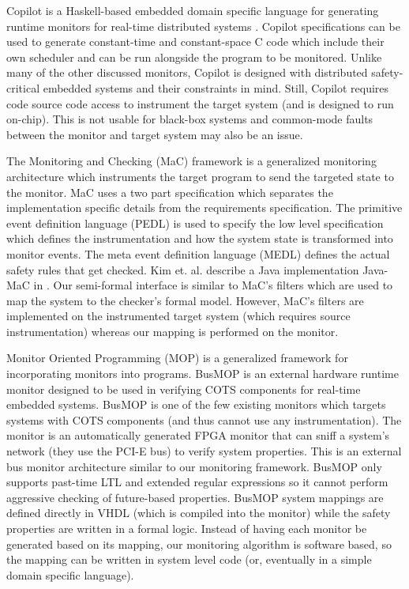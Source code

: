 \documentclass[]{llncs}
\begin{document}


Copilot is a Haskell-based embedded domain specific language for generating runtime monitors for real-time distributed systems \cite{Pike2010}. 
Copilot specifications can be used to generate constant-time and constant-space C code which include their own scheduler and can be run alongside the program to be monitored.
Unlike many of the other discussed monitors, Copilot is designed with distributed safety-critical embedded systems and their constraints in mind. 
Still, Copilot requires code source code access to instrument the target system (and is designed to run on-chip). This is not usable for black-box systems and common-mode faults between the monitor and target system may also be an issue.

The Monitoring and Checking (MaC) framework \cite{Lee1999} is a generalized monitoring architecture which instruments the target program to send the targeted state to the monitor. MaC uses a two part specification which separates the implementation specific details from the requirements specification. 
The primitive event definition language (PEDL) is used to specify the low level specification which defines the instrumentation and how the system state is transformed into monitor events. The meta event definition language (MEDL) defines the actual safety rules that get checked. Kim et. al. describe a Java implementation Java-MaC in \cite{Kim2004}.
Our semi-formal interface is similar to MaC's filters which are used to map the system to the checker's formal model. However, MaC's filters are implemented on the instrumented target system (which requires source instrumentation) whereas our mapping is performed on the monitor.

Monitor Oriented Programming (MOP) is a generalized framework for incorporating monitors into programs.
BusMOP \cite{Pellizzoni2008} is an external hardware runtime monitor designed to be used in verifying COTS components for real-time embedded systems. BusMOP is one of the few existing monitors which targets systems with COTS components (and thus cannot use any instrumentation). The monitor is an automatically generated FPGA monitor that can sniff a system's network (they use the PCI-E bus) to verify system properties.
This is an external bus monitor architecture similar to our monitoring framework.
BusMOP only supports past-time LTL and extended regular expressions so it cannot perform aggressive checking of future-based properties. BusMOP system mappings are defined directly in VHDL (which is compiled into the monitor) while the safety properties are written in a formal logic. Instead of having each monitor be generated based on its mapping, our monitoring algorithm is software based, so the mapping can be written in system level code (or, eventually in a simple domain specific language).
\end{document}

